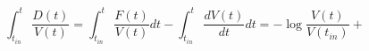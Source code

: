 \begin{equation}
\int_{t_{in}}^t \frac{D(t)}{V(t)}=\int_{t_{in}}^t \frac{F(t)}{V(t)} dt - \int_{t_{in}}^t \frac{dV(t)}{dt} dt = -\log \frac{V(t)}{V(t_{in})}+ 
\end{equation}